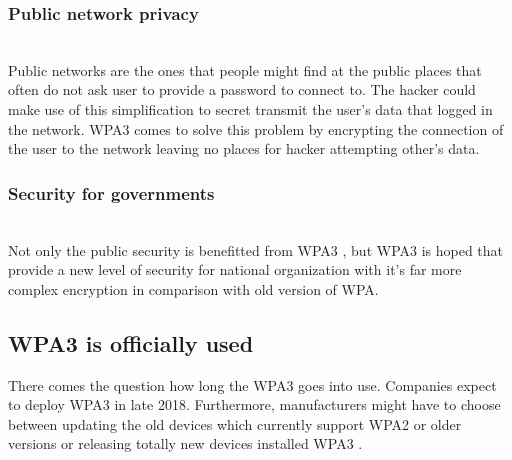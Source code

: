 \subsubsection{Public network privacy}~\\
Public networks are the ones that people might find at the public places that often do not ask user to provide a password to connect to. The hacker could make use of this simplification to secret transmit the user’s data that logged in the network.
WPA3 \cite{hoffman_2018} comes to solve this problem by encrypting the connection of the user to the network leaving no places for hacker attempting other’s data.
\subsubsection{Security for governments}~\\
Not only the public security is benefitted from WPA3 \cite{hoffman_2018}, but WPA3 \cite{hoffman_2018} is hoped that provide a new level of security for national organization with it’s far more complex encryption in comparison with old version of WPA.
\subsection{WPA3 is officially used }
There comes the question how long the WPA3 \cite{hoffman_2018} goes into use. Companies expect to deploy WPA3 \cite{hoffman_2018} in late 2018. Furthermore, manufacturers might have to choose between updating the old devices which currently support WPA2 or older versions or releasing totally new devices installed WPA3 \cite{hoffman_2018}.